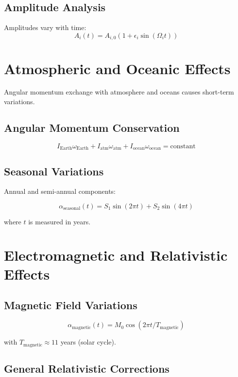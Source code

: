 \documentclass[12pt,a4paper]{report}
\begin{document}
\subsection{Amplitude Analysis}

Amplitudes vary with time:
\[
A_i(t) = A_{i,0} \left(1 + \epsilon_i \sin(\Omega_i t)\right)
\]

\section{Atmospheric and Oceanic Effects}

Angular momentum exchange with atmosphere and oceans causes short-term variations.

\subsection{Angular Momentum Conservation}

\[
I_{\text{Earth}} \omega_{\text{Earth}} + I_{\text{atm}} \omega_{\text{atm}} + I_{\text{ocean}} \omega_{\text{ocean}} = \text{constant}
\]

\subsection{Seasonal Variations}

Annual and semi-annual components:

\[
\alpha_{\text{seasonal}}(t) = S_1 \sin(2\pi t) + S_2 \sin(4\pi t)
\]

where $t$ is measured in years.

\section{Electromagnetic and Relativistic Effects}

\subsection{Magnetic Field Variations}

\[
\alpha_{\text{magnetic}}(t) = M_0 \cos(2\pi t/T_{\text{magnetic}})
\]

with $T_{\text{magnetic}} \approx 11$ years (solar cycle).

\subsection{General Relativistic Corrections}
\end{document}

